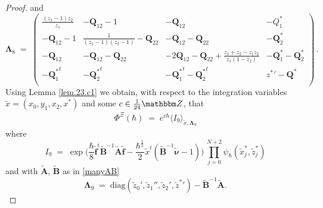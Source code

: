 \documentclass[12pt,reqno]{amsart}
\theoremstyle{definition}
\def\BZ{\mathbbm Z}
\def\diag{\mathrm{diag}}
\newcommand{\bea}{\begin{equation}\begin{aligned}}
\newcommand{\eea}{\end{aligned}\end{equation}}
\renewcommand{\=}{\;=\;}
\newcommand{\hsqrt}{\hbar^{\frac{1}{2}}}
\begin{document}
\begin{proof}
and
\[
\mathbf \Lambda_8 \=
\left(\!\!
\begin{array}{ccc|c}
\frac{({z_1}-1) {z_2}}{{z_1}} & -{\mathbf Q_{12}}-1 &
-{\mathbf Q_{12}} & -{Q_{1}^*} \\
-{\mathbf Q_{12}}-1 & \frac{1}{({z_1}-1) ({z_2}-1)}-{\mathbf Q_{22}} &
-{\mathbf Q_{12}}-{\mathbf Q_{22}} & -{\mathbf Q_{2}^*}
\\
-{\mathbf Q_{12}} & -{\mathbf Q_{12}}-{\mathbf Q_{22}} & 
-2 {\mathbf Q_{12}}-\mathbf Q_{22} + \frac{z_1+z_2-z_1z_2}{z_1(1-z_2)}
& -{\mathbf Q_{1}^*}-{\mathbf Q_{2}^*} \\
\hline
-{\mathbf Q_{1}^*}^t & -{\mathbf Q_{2}^*}^t &
-{\mathbf Q_{1}^*}^t-{\mathbf Q_{2}^*}^t & {z^*}'-{\mathbf Q^*} \\
\end{array}
\!\!\right) \,.
\]
Using Lemma \ref{lem.23.c1} we obtain, with respect to the integration
variables $\tilde x = (x_0,y_1,x_2,x^*)$ and some $c\in\frac{1}{24}\BZ$, that
\bea
\Phi^{\Xi}(\hbar) \=e^{c\hbar}
\langle I_9 \rangle_{\tilde x, \mathbf \Lambda_9}
\eea
where
\[
I_9 \= \exp\Big(\frac\hbar8 \widetilde{\mathbf f}^t \widetilde{\mathbf B}^{-1}
\widetilde{\mathbf A} \widetilde{\mathbf f}
-\frac{\hsqrt}2 \tilde x^t(\widetilde {\mathbf B}^{-1}
\widetilde{\boldsymbol{\nu}}-1)\Big)\,
\prod_{j=0}^{N+2} \psi_{\hbar}( \widetilde{x}_j^*, \widetilde{z}_j^*)
\]
and with $\widetilde {\mathbf A}$, $ \widetilde {\mathbf B}$ as in 
\eqref{manyAB}
\[
\mathbf \Lambda_9 \=
\diag(\widetilde{z}_0',
\widetilde{z}_1'',
\widetilde{z}_2',
\widetilde{z}^*{}')
- {\widetilde {\mathbf B}}^{-1}\widetilde {\mathbf A}.
\]
\end{proof}
\end{document}
